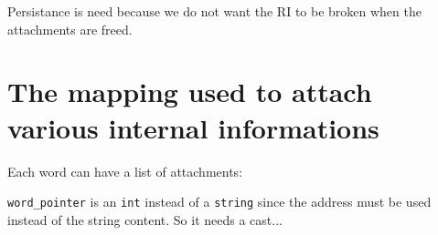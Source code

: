 Persistance is need because we do not want the RI to be broken when
the attachments are freed.

\section{The mapping used to attach various internal informations}


Each word can have a list of attachments:

\verb|word_pointer| is an {\tt int} instead of a {\tt string} since
the address must be used instead of the string content. So it needs a
cast...




